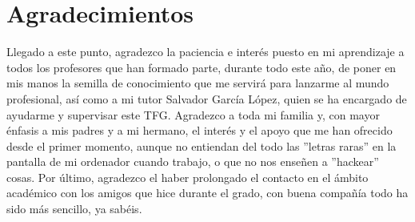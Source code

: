 \noindent \textbf{\myProf}

\chapter*{Agradecimientos}
\thispagestyle{empty}

       \vspace{1cm}

Llegado a este punto, agradezco la paciencia e interés puesto en mi aprendizaje a todos los profesores que han formado parte, durante todo este año, de poner en mis manos la semilla de conocimiento que me servirá para lanzarme al mundo profesional, así como a mi tutor Salvador García López, quien se ha encargado de ayudarme y supervisar este TFG.
Agradezco a toda mi familia y, con mayor énfasis a mis padres y a mi hermano, el interés y el apoyo que me han ofrecido desde el primer momento, aunque no entiendan del todo las ''letras raras'' en la pantalla de mi ordenador cuando trabajo, o que no nos enseñen a ''hackear'' cosas. Por último, agradezco el haber prolongado el contacto en el ámbito académico con los amigos que hice durante el grado, con buena compañía todo ha sido más sencillo, ya sabéis.
